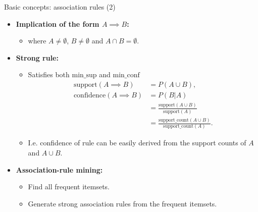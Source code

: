 \documentclass[aspectratio=169,t,xcolor=dvipsnames]{beamer}
\begin{document}
  {
    \begin{frame}{Basic concepts: association rules (2)}
    \begin{itemize}
      \item \textbf{Implication of the form $A \implies B$:}
      \begin{itemize}
        \item where $A \neq \emptyset$, $B \neq \emptyset$ and $A \cap B = \emptyset$.
      \end{itemize}
      \item \textbf{Strong rule:}
      \begin{itemize}
        \item Satisfies both $\text{min\_sup}$ and $\text{min\_conf}$
        \begin{align}
        \text{support}(A \implies B) &= P(A \cup B),\\
        \text{confidence}(A \implies B) &= P(B | A)\\
        &= \frac{\text{support}(A \cup B)}{\text{support}(A)}\\
        &= \frac{\text{support\_count}(A\cup B)}{\text{support\_count}(A)}.
        \end{align}
        \item I.e. confidence of rule can be easily derived from the support counts of $A$ and $A \cup B$.
      \end{itemize}
      \item \textbf{Association-rule mining:}
      \begin{itemize}
        \item Find all frequent itemsets.
        \item Generate strong association rules from the frequent itemsets.
      \end{itemize}
    \end{itemize}
    \end{frame}
  }
\end{document}

